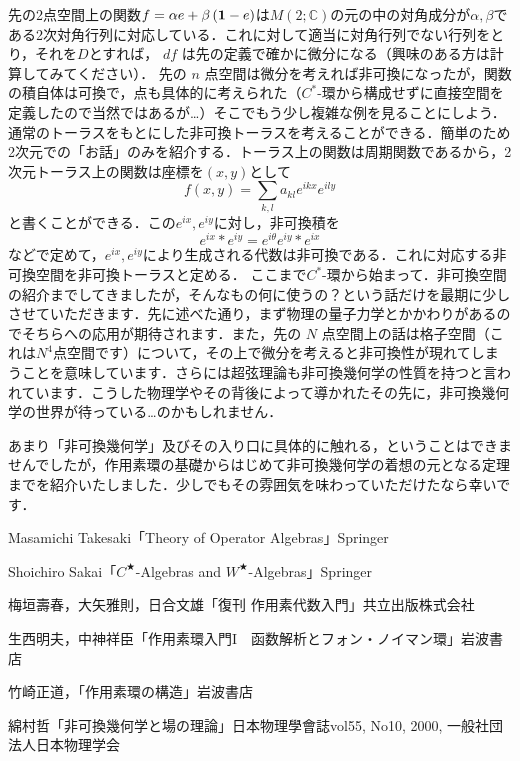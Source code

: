 先の2点空間上の関数$f=\alpha e+\beta \left({\bf 1}-e\right)$は$M\left(2;\mathbb{C}\right)$の元の中の対角成分が$\alpha,\beta$である2次対角行列に対応している．これに対して適当に対角行列でない行列をとり，それを$D$とすれば， $df$ は先の定義で確かに微分になる（興味のある方は計算してみてください）．
先の $n$ 点空間は微分を考えれば非可換になったが，関数の積自体は可換で，点も具体的に考えられた（$C^*$-環から構成せずに直接空間を定義したので当然ではあるが…）そこでもう少し複雑な例を見ることにしよう．通常のトーラスをもとにした非可換トーラスを考えることができる．簡単のため2次元での「お話」のみを紹介する．トーラス上の関数は周期関数であるから，2次元トーラス上の関数は座標を$\left(x,y\right)$として
\[f(x,y)=\sum_{k,l} a_{kl}e^{ikx}e^{ily}\]
と書くことができる．この$e^{ix},e^{iy}$に対し，非可換積を
\[e^{ix}*e^{iy}=e^{i\theta}e^{iy}*e^{ix}\]
などで定めて，$e^{ix},e^{iy}$により生成される代数は非可換である．これに対応する非可換空間を非可換トーラスと定める．
ここまで$C^*$-環から始まって．非可換空間の紹介までしてきましたが，そんなもの何に使うの？という話だけを最期に少しさせていただきます．先に述べた通り，まず物理の量子力学とかかわりがあるのでそちらへの応用が期待されます．また，先の $N$ 点空間上の話は格子空間（これは$N^4$点空間です）について，その上で微分を考えると非可換性が現れてしまうことを意味しています．さらには超弦理論も非可換幾何学の性質を持つと言われています．こうした物理学やその背後によって導かれたその先に，非可換幾何学の世界が待っている…のかもしれません．

あまり「非可換幾何学」及びその入り口に具体的に触れる，ということはできませんでしたが，作用素環の基礎からはじめて非可換幾何学の着想の元となる定理までを紹介いたしました．少しでもその雰囲気を味わっていただけたなら幸いです．

\begin{thebibliography}{9}
\item Masamichi Takesaki「Theory of Operator Algebras」Springer
\item Shoichiro Sakai「$C^★$-Algebras and $W^★$-Algebras」Springer
\item 梅垣壽春，大矢雅則，日合文雄「復刊 作用素代数入門」共立出版株式会社
\item 生西明夫，中神祥臣「作用素環入門I　函数解析とフォン・ノイマン環」岩波書店
\item 竹崎正道，「作用素環の構造」岩波書店
\item 綿村哲「非可換幾何学と場の理論」日本物理學會誌vol55, No10, 2000, 一般社団法人日本物理学会
\end{thebibliography}
